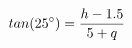 \documentclass[preview]{standalone}
\begin{document}
\begin{align*}
tan( 25^{\circ} ) =  {{h  -  1.5  } \over {  5  +  q  } }
\end{align*}
\end{document}
